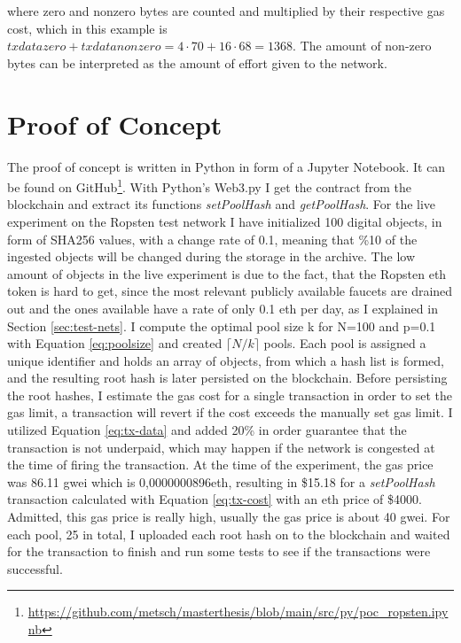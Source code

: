 \documentclass[final]{vutinfth}
\begin{document}

where zero and nonzero bytes are counted and multiplied by their respective gas cost, which in this example is $txdatazero+txdatanonzero = 4 \cdot 70 + 16 \cdot 68 = 1368 $. The amount of non-zero bytes can be interpreted as the amount of effort given to the network.

\section{Proof of Concept}\label{sec:poc}
The proof of concept is written in Python in form of a Jupyter Notebook. It can be found on GitHub\footnote{\url{https://github.com/metsch/masterthesis/blob/main/src/py/poc_ropsten.ipynb}}. With Python's Web3.py I get the contract from the blockchain and extract its functions \textit{setPoolHash} and \textit{getPoolHash}. For the live experiment on the Ropsten test network I have initialized 100 digital objects, in form of SHA256 values, with a change rate of 0.1, meaning that \%10 of the ingested objects will be changed during the storage in the archive. The low amount of objects in the live experiment is due to the fact, that the Ropsten \acrlong{eth} token is hard to get, since the most relevant publicly available faucets are drained out and the ones available have a rate of only 0.1 \acrlong{eth} per day, as I explained in Section \ref{sec:test-nets}. I compute the optimal pool size k for N=100 and p=0.1 with Equation \ref{eq:poolsize} and created $\lceil N/k \rceil$ pools. Each pool is assigned a unique identifier and holds an array of objects, from which a hash list is formed, and the resulting root hash is later persisted on the blockchain. 
Before persisting the root hashes, I estimate the gas cost for a single transaction in order to set the gas limit, a transaction will revert if the cost exceeds the manually set gas limit. I utilized Equation \ref{eq:tx-data} and added 20\% in order guarantee that the transaction is not underpaid, which may happen if the network is congested at the time of firing the transaction.
At the time of the experiment, the gas price was 86.11 gwei which is 0,0000000896\acrshort{eth}, resulting in \$15.18 for a \textit{setPoolHash} transaction calculated with Equation \ref{eq:tx-cost} with an \acrshort{eth} price of \$4000. Admitted, this gas price is really high, usually the gas price is about 40 gwei. 
For each pool, 25 in total, I uploaded each root hash on to the blockchain and waited for the transaction to finish and run some tests to see if the transactions were successful.
\end{document}
